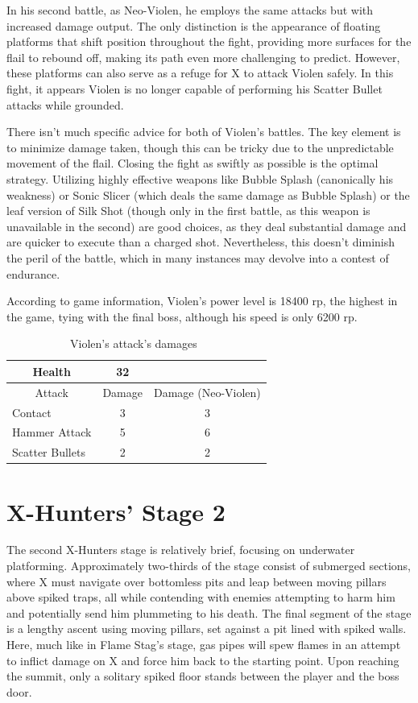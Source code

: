 In his second battle, as Neo-Violen, he employs the same attacks but with increased damage output. The only distinction is the appearance of floating platforms that shift position throughout the fight, providing more surfaces for the flail to rebound off, making its path even more challenging to predict. However, these platforms can also serve as a refuge for X to attack Violen safely. In this fight, it appears Violen is no longer capable of performing his Scatter Bullet attacks while grounded.

There isn't much specific advice for both of Violen's battles. The key element is to minimize damage taken, though this can be tricky due to the unpredictable movement of the flail. Closing the fight as swiftly as possible is the optimal strategy. Utilizing highly effective weapons like Bubble Splash (canonically his weakness) or Sonic Slicer (which deals the same damage as Bubble Splash) or the leaf version of Silk Shot (though only in the first battle, as this weapon is unavailable in the second) are good choices, as they deal substantial damage and are quicker to execute than a charged shot. Nevertheless, this doesn't diminish the peril of the battle, which in many instances may devolve into a contest of endurance.

According to game information, Violen's power level is 18400 rp, the highest in the game, tying with the final boss, although his speed is only 6200 rp.
\begin{table}[htp]
	\centering
	\begin{tabular}[h]{l c c}
		\toprule
		\multicolumn{1}{c}{Health}  & 32 &\\
		\midrule
		\multicolumn{1}{c}{Attack} & \multicolumn{1}{c}{Damage}& \multicolumn{1}{c}{Damage (Neo-Violen)}\\
		Contact & 3 & 3\\
		Hammer Attack & 5& 6\\
		Scatter Bullets & 2& 2\\
		\bottomrule
	\end{tabular}
	\caption{Violen's attack's damages~\cite{wiki:Violen}}
\end{table}

\section{X-Hunters' Stage 2}

The second X-Hunters stage is relatively brief, focusing on underwater platforming. Approximately two-thirds of the stage consist of submerged sections, where X must navigate over bottomless pits and leap between moving pillars above spiked traps, all while contending with enemies attempting to harm him and potentially send him plummeting to his death. The final segment of the stage is a lengthy ascent using moving pillars, set against a pit lined with spiked walls. Here, much like in Flame Stag's stage, gas pipes will spew flames in an attempt to inflict damage on X and force him back to the starting point. Upon reaching the summit, only a solitary spiked floor stands between the player and the boss door.

